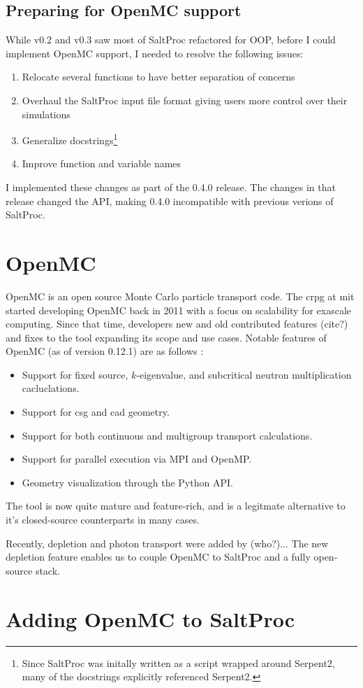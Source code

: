 \subsection{Preparing for OpenMC support}%
\label{sub:refactoring}
While v0.2 and v0.3 saw most of SaltProc refactored for OOP, before I could implement OpenMC support, I needed to resolve the following issues:
\begin{enumerate}
    \item Relocate several functions to have better separation of concerns
    \item Overhaul the SaltProc input file format giving users more control over their simulations
    \item Generalize docstrings\footnote{Since SaltProc was initally written as a script wrapped around Serpent2, many of the docstrings explicitly referenced Serpent2.}
    \item Improve function and variable names
\end{enumerate}
I implemented these changes as part of the 0.4.0 release. The changes in that release changed the API, making 0.4.0 incompatible with previous verions of SaltProc.

\section{OpenMC}%
\label{sec:openmc}

OpenMC \cite{romano_openmc_2015} is an open source Monte Carlo particle transport code. The \Gls{crpg} at \Gls{mit} started developing OpenMC back in 2011 with a focus on scalability for exascale computing. Since that time, developers new and old contributed features (cite?) and fixes to the tool expanding its scope and use cases. Notable features of OpenMC (as of version 0.12.1) are as follows \cite{homepage_openmc_2022}:
\begin{itemize}
    \item Support for fixed source, $k$-eigenvalue, and subcritical neutron multiplication cacluclations.
    \item Support for \Gls{csg} and \Gls{cad} geometry.
    \item Support for both continuous and multigroup transport calculations.
    \item Support for parallel execution via MPI and OpenMP.
    \item Geometry visualization through the Python API.
\end{itemize}
The tool is now quite mature and feature-rich, and is a legitmate alternative to it's closed-source counterparts in many cases.

Recently, depletion and photon transport were added by (who?)... The new depletion feature enables us to couple OpenMC to SaltProc and a fully open-source stack.

\section{Adding OpenMC to SaltProc}%
\label{sec:adding_openmc_to_saltproc}


